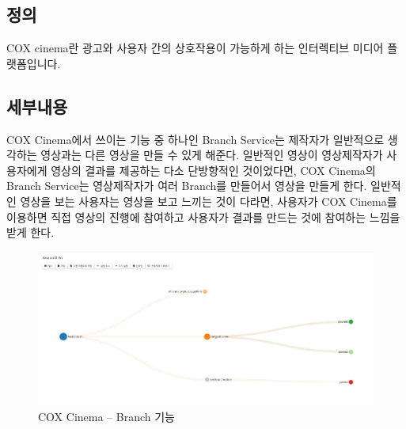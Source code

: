 \documentclass[chapter,oneside]{oblivoir}
\begin{document}
\subsection{정의}

COX cinema란 광고와 사용자 간의 상호작용이 가능하게 하는 인터렉티브 미디어 플랫폼입니다. 	


\subsection{ 세부내용}

COX Cinema에서 쓰이는 기능 중 하나인 Branch Service는 제작자가 일반적으로 생각하는 영상과는 다른 영상을 만들 수 있게 해준다. 일반적인 영상이 영상제작자가 사용자에게 영상의 결과를 제공하는 다소 단방향적인 것이었다면, COX Cinema의 Branch Service는 영상제작자가 여러 Branch를 만들어서 영상을 만들게 한다. 일반적인 영상을 보는 사용자는 영상을 보고 느끼는 것이 다라면, 사용자가 COX Cinema를 이용하면 직접 영상의 진행에 참여하고 사용자가 결과를 만드는 것에 참여하는 느낌을 받게 한다.     

\begin{figure}[h!]
    \centering
        \includegraphics{pic/chp7/img994}
    \caption{COX Cinema – Branch 기능}
\end{figure}
\end{document}
